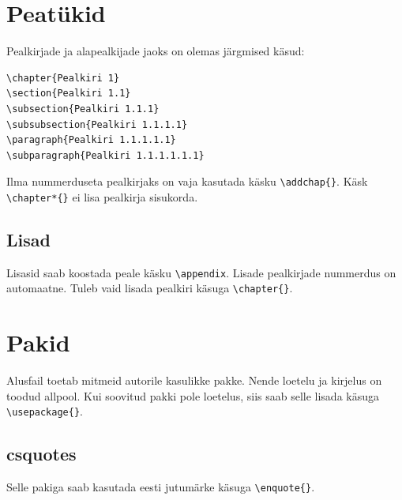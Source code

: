 \documentclass{trkut}%
\begin{document}
\section{Peatükid}
Pealkirjade ja alapealkijade jaoks on olemas järgmised käsud: 
\begin{verbatim}
\chapter{Pealkiri 1}
\section{Pealkiri 1.1}
\subsection{Pealkiri 1.1.1}
\subsubsection{Pealkiri 1.1.1.1}
\paragraph{Pealkiri 1.1.1.1.1}
\subparagraph{Pealkiri 1.1.1.1.1.1}
\end{verbatim}

Ilma nummerduseta pealkirjaks on vaja kasutada käsku \verb!\addchap{}!. Käsk \verb!\chapter*{}! ei lisa pealkirja sisukorda. 

\subsection{Lisad}
Lisasid saab koostada peale käsku \verb!\appendix!. Lisade pealkirjade nummerdus on automaatne. Tuleb vaid lisada pealkiri käsuga \verb!\chapter{}!.

\section{Pakid}
Alusfail toetab mitmeid autorile kasulikke pakke. Nende loetelu ja kirjelus on toodud allpool. Kui soovitud pakki pole loetelus, siis saab selle lisada käsuga \verb!\usepackage{}!.
\subsection{\textsf{csquotes}}
Selle pakiga saab kasutada eesti jutumärke käsuga \verb!\enquote{}!.
\end{document}
